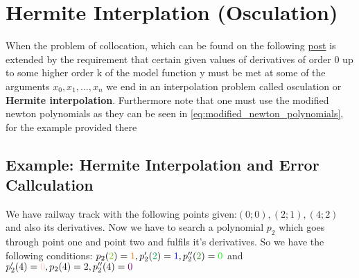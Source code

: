 \section{Hermite Interplation (Osculation)}
When the problem of collocation, which can be found on the following \href{https://mmeyer.tech/newton-polynomial-interpolation-collocation/}{post} is extended by the requirement that certain given values of derivatives of order 0 up to some higher order k of the model function y must be met at some of the arguments $x_0,x_1,..., x_n$ we end in an interpolation problem called osculation or \textbf{Hermite interpolation}. Furthermore note that one must use the modified newton polynomials as they can be seen in \autoref{eq:modified_newton_polynomials}, for the example provided there

\subsection{Example: Hermite Interpolation and Error Callculation}
We have railway track with the following points given:$(0;0),(2;1),(4;2)$ and also its derivatives. Now we have to search a polynomial $p_2$ which goes through point one and point two and fulfils it's derivatives. So we have the following conditions: $p_2(\textcolor{LimeGreen}{2})=\textcolor{orange}{1}, p_2'(\textcolor{Green}{2})=\textcolor{blue}{1}, p_2''(\textcolor{OliveGreen}{2})=\textcolor{green}{0}$ and $p_2'(4)=\textcolor{pink}{0}, p_2(4)=2, p_2''(4)=\textcolor{violet}{0}$

